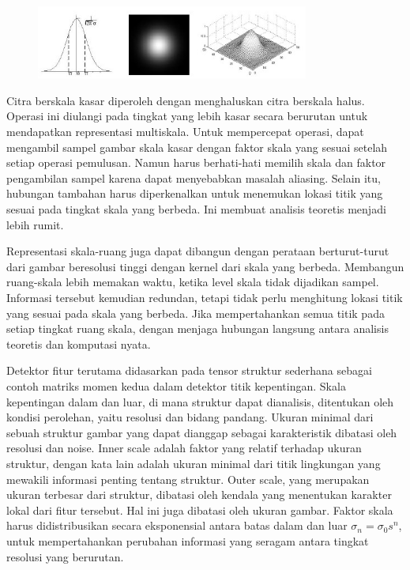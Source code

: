 \begin{figure}
  \centering{}
  \includegraphics[width=0.8\textwidth]{gambar/Uniform Gaussian kernel.jpg}
  \caption{}
\end{figure}

Citra berskala kasar diperoleh dengan menghaluskan citra berskala halus. 
Operasi ini diulangi pada tingkat yang lebih kasar secara berurutan untuk 
mendapatkan representasi multiskala. Untuk mempercepat operasi, dapat 
mengambil sampel gambar skala kasar dengan faktor skala yang sesuai setelah setiap 
operasi pemulusan. Namun harus berhati-hati memilih skala dan faktor pengambilan 
sampel karena dapat menyebabkan masalah aliasing. Selain itu, hubungan 
tambahan harus diperkenalkan untuk menemukan lokasi titik yang sesuai pada 
tingkat skala yang berbeda. Ini membuat analisis teoretis menjadi lebih rumit.

Representasi skala-ruang juga dapat dibangun dengan perataan berturut-turut dari 
gambar beresolusi tinggi dengan kernel dari skala yang berbeda. Membangun 
ruang-skala lebih memakan waktu, ketika level skala tidak dijadikan sampel. 
Informasi tersebut kemudian redundan, tetapi tidak perlu menghitung lokasi 
titik yang sesuai pada skala yang berbeda. Jika mempertahankan semua titik 
pada setiap tingkat ruang skala, dengan menjaga hubungan langsung antara 
analisis teoretis dan komputasi nyata.

Detektor fitur terutama didasarkan pada tensor struktur sederhana sebagai contoh 
matriks momen kedua dalam detektor titik kepentingan. Skala kepentingan dalam dan luar, 
di mana struktur dapat dianalisis, ditentukan oleh kondisi perolehan, yaitu resolusi 
dan bidang pandang. Ukuran minimal dari sebuah struktur gambar yang dapat dianggap 
sebagai karakteristik dibatasi oleh resolusi dan noise. Inner scale adalah faktor yang 
relatif terhadap ukuran struktur, dengan kata lain adalah ukuran minimal dari titik 
lingkungan yang mewakili informasi penting tentang struktur. Outer scale, yang merupakan 
ukuran terbesar dari struktur, dibatasi oleh kendala yang menentukan karakter lokal dari fitur tersebut. 
Hal ini juga dibatasi oleh ukuran gambar. Faktor skala harus didistribusikan secara 
eksponensial antara batas dalam dan luar \(\sigma_{n} = \sigma_{0}s^{n}\), 
untuk mempertahankan perubahan informasi yang seragam antara tingkat resolusi yang berurutan.


